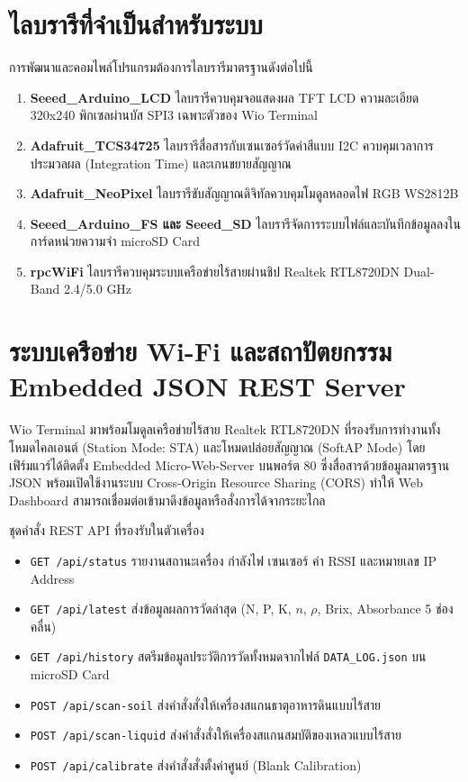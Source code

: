 \section{ไลบรารีที่จำเป็นสำหรับระบบ}
การพัฒนาและคอมไพล์โปรแกรมต้องการไลบรารีมาตรฐานดังต่อไปนี้

\begin{enumerate}[leftmargin=1.5em, itemsep=3pt]
    \item \textbf{Seeed\_Arduino\_LCD} ไลบรารีควบคุมจอแสดงผล TFT LCD ความละเอียด 320x240 พิกเซลผ่านบัส SPI3 เฉพาะตัวของ Wio Terminal
    \item \textbf{Adafruit\_TCS34725} ไลบรารีสื่อสารกับเซนเซอร์วัดค่าสีแบบ I2C ควบคุมเวลาการประมวลผล (Integration Time) และเกนขยายสัญญาณ
    \item \textbf{Adafruit\_NeoPixel} ไลบรารีขับสัญญาณดิจิทัลควบคุมโมดูลหลอดไฟ RGB WS2812B
    \item \textbf{Seeed\_Arduino\_FS และ Seeed\_SD} ไลบรารีจัดการระบบไฟล์และบันทึกข้อมูลลงในการ์ดหน่วยความจำ microSD Card
    \item \textbf{rpcWiFi} ไลบรารีควบคุมระบบเครือข่ายไร้สายผ่านชิป Realtek RTL8720DN Dual-Band 2.4/5.0 GHz
\end{enumerate}

\section{ระบบเครือข่าย Wi-Fi และสถาปัตยกรรม Embedded JSON REST Server}
Wio Terminal มาพร้อมโมดูลเครือข่ายไร้สาย Realtek RTL8720DN ที่รองรับการทำงานทั้งโหมดไคลเอนต์ (Station Mode: STA) และโหมดปล่อยสัญญาณ (SoftAP Mode) โดยเฟิร์มแวร์ได้ติดตั้ง Embedded Micro-Web-Server บนพอร์ต 80 ซึ่งสื่อสารด้วยข้อมูลมาตรฐาน JSON พร้อมเปิดใช้งานระบบ Cross-Origin Resource Sharing (CORS) ทำให้ Web Dashboard สามารถเชื่อมต่อเข้ามาดึงข้อมูลหรือสั่งการได้จากระยะไกล

ชุดคำสั่ง REST API ที่รองรับในตัวเครื่อง
\begin{itemize}[leftmargin=1.5em, itemsep=2pt]
    \item \texttt{GET /api/status} รายงานสถานะเครื่อง กำลังไฟ เซนเซอร์ ค่า RSSI และหมายเลข IP Address
    \item \texttt{GET /api/latest} ส่งข้อมูลผลการวัดล่าสุด (N, P, K, $n$, $\rho$, Brix, Absorbance 5 ช่องคลื่น)
    \item \texttt{GET /api/history} สตรีมข้อมูลประวัติการวัดทั้งหมดจากไฟล์ \texttt{DATA\_LOG.json} บน microSD Card
    \item \texttt{POST /api/scan-soil} ส่งคำสั่งสั่งให้เครื่องสแกนธาตุอาหารดินแบบไร้สาย
    \item \texttt{POST /api/scan-liquid} ส่งคำสั่งสั่งให้เครื่องสแกนสมบัติของเหลวแบบไร้สาย
    \item \texttt{POST /api/calibrate} ส่งคำสั่งสั่งตั้งค่าศูนย์ (Blank Calibration)
\end{itemize}

